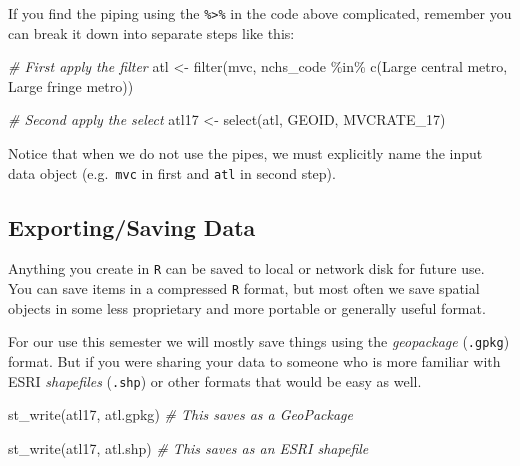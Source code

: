 \documentclass[
]{book}
\newenvironment{Shaded}{\begin{snugshade}}{\end{snugshade}}
\newcommand{\CommentTok}[1]{\textcolor[rgb]{0.56,0.35,0.01}{\textit{#1}}}
\newcommand{\FunctionTok}[1]{\textcolor[rgb]{0.00,0.00,0.00}{#1}}
\newcommand{\NormalTok}[1]{#1}
\newcommand{\OtherTok}[1]{\textcolor[rgb]{0.56,0.35,0.01}{#1}}
\newcommand{\SpecialCharTok}[1]{\textcolor[rgb]{0.00,0.00,0.00}{#1}}
\newcommand{\StringTok}[1]{\textcolor[rgb]{0.31,0.60,0.02}{#1}}
\newenvironment{rmdnote}[1]
  {
  \begin{itemize}
  \renewcommand{\labelitemi}{
    \raisebox{-.7\height}[0pt][0pt]{
      {\setkeys{Gin}{width=3em,keepaspectratio}\texttt{[image: images/\#1]}}
    }
  }
  \setlength{\fboxsep}{1em}
  \begin{note}
  \item
  }
  {
  \end{note}
  \end{itemize}
  }
\begin{document}
\begin{rmdnote}{note}
If you find the piping using the \texttt{\%\textgreater{}\%} in the code above complicated, remember you can break it down into separate steps like this:

\begin{Shaded}
\begin{Highlighting}[]
\CommentTok{\# First apply the filter}
\NormalTok{atl }\OtherTok{\textless{}{-}} \FunctionTok{filter}\NormalTok{(mvc, nchs\_code }\SpecialCharTok{\%in\%} \FunctionTok{c}\NormalTok{(}\StringTok{\textquotesingle{}Large central metro\textquotesingle{}}\NormalTok{, }\StringTok{\textquotesingle{}Large fringe metro\textquotesingle{}}\NormalTok{))}

\CommentTok{\# Second apply the select}
\NormalTok{atl17 }\OtherTok{\textless{}{-}} \FunctionTok{select}\NormalTok{(atl, GEOID, MVCRATE\_17)}
\end{Highlighting}
\end{Shaded}

Notice that when we do not use the pipes, we must explicitly name the input data object (e.g.~\texttt{mvc} in first and \texttt{atl} in second step).

\end{rmdnote}

\hypertarget{exportingsaving-data}{%
\subsection{Exporting/Saving Data}\label{exportingsaving-data}}

Anything you create in \texttt{R} can be saved to local or network disk for future use. You can save items in a compressed \texttt{R} format, but most often we save spatial objects in some less proprietary and more portable or generally useful format.

For our use this semester we will mostly save things using the \emph{geopackage} (\texttt{.gpkg}) format. But if you were sharing your data to someone who is more familiar with ESRI \emph{shapefiles} (\texttt{.shp}) or other formats that would be easy as well.

\begin{Shaded}
\begin{Highlighting}[]
\FunctionTok{st\_write}\NormalTok{(atl17, }\StringTok{\textquotesingle{}atl.gpkg\textquotesingle{}}\NormalTok{)  }\CommentTok{\# This saves as a GeoPackage}

\FunctionTok{st\_write}\NormalTok{(atl17, }\StringTok{\textquotesingle{}atl.shp\textquotesingle{}}\NormalTok{)  }\CommentTok{\# This saves as an ESRI shapefile}
\end{Highlighting}
\end{Shaded}
\end{document}
